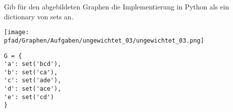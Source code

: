 ﻿\question[3]
Gib für den abgebildeten Graphen die Implementierung in Python als
ein dictionary von sets an.

\texttt{[image: \\pfad/Graphen/Aufgaben/ungewichtet\_03/ungewichtet\_03.png]}
\begin{solutionbox}{5cm}
\begin{lstlisting}
G = {
'a': set('bcd'),
'b': set('ca'),
'c': set('ade'),
'd': set('ace'),
'e': set('cd')
}
\end{lstlisting}
\end{solutionbox}
